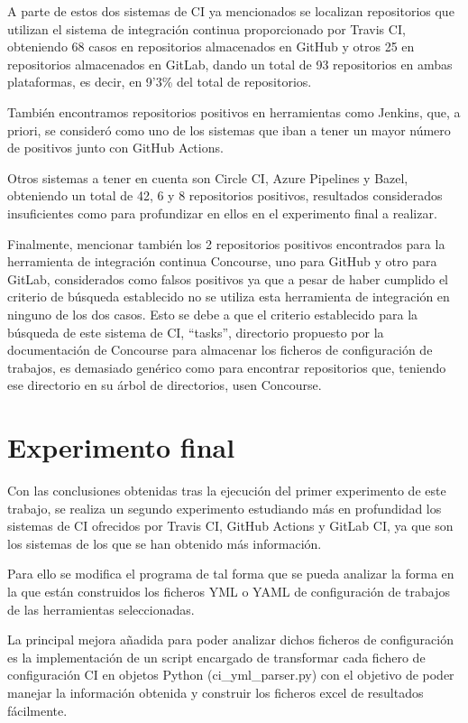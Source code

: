A parte de estos dos sistemas de CI ya mencionados se localizan repositorios que utilizan el sistema de integración continua proporcionado por Travis CI, obteniendo 68 casos en repositorios almacenados en GitHub y otros 25 en repositorios almacenados en GitLab, dando un total de 93 repositorios en ambas plataformas, es decir, en 9'3\% del total de repositorios.

También encontramos repositorios positivos en herramientas como Jenkins, que, a priori, se consideró como uno de los sistemas que iban a tener un mayor número de positivos junto con GitHub Actions.

Otros sistemas a tener en cuenta son Circle CI, Azure Pipelines y Bazel, obteniendo un total de 42, 6 y 8 repositorios positivos, resultados considerados insuficientes como para profundizar en ellos en el experimento final a realizar.

Finalmente, mencionar también los 2 repositorios positivos encontrados para la herramienta de integración continua Concourse, uno para GitHub y otro para GitLab, considerados como falsos positivos ya que a pesar de haber cumplido el criterio de búsqueda establecido no se utiliza esta herramienta de integración en ninguno de los dos casos. Esto se debe a que el criterio establecido para la búsqueda de este sistema de CI, ``tasks'', directorio propuesto por la documentación de Concourse para almacenar los ficheros de configuración de trabajos, es demasiado genérico como para encontrar repositorios que, teniendo ese directorio en su árbol de directorios, usen Concourse.

\section{Experimento final}
Con las conclusiones obtenidas tras la ejecución del primer experimento de este trabajo, se realiza un segundo experimento estudiando más en profundidad los sistemas de CI ofrecidos por Travis CI, GitHub Actions y GitLab CI, ya que son los sistemas de los que se han obtenido más información.

Para ello se modifica el programa de tal forma que se pueda analizar la forma en la que están construidos los ficheros YML o YAML de configuración de trabajos de las herramientas seleccionadas.

La principal mejora añadida para poder analizar dichos ficheros de configuración es la implementación de un script encargado de transformar cada fichero de configuración CI en objetos Python (ci\_yml\_parser.py) con el objetivo de poder manejar la información obtenida y construir los ficheros excel de resultados fácilmente.

